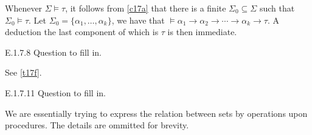 Whenever $\Sigma\vDash\tau$, it follows from \ref{c17a} that there is a finite $\Sigma_0\subseteq \Sigma$ such that $\Sigma_0\vDash\tau$. Let $\Sigma_0=\{\alpha_1,\dots,\alpha_k\}$, we have that $\vDash \alpha_1\rightarrow \alpha_2\rightarrow\cdots\rightarrow \alpha_k\rightarrow\tau$.  A deduction the last component of which is $\tau$ is then immediate.

\begin{exercise}{E.1.7.8}
  Question to fill in.
\end{exercise}

See \ref{t17f}.

\setcounter{exercise}{10}

\begin{exercise}{E.1.7.11}
  Question to fill in.
\end{exercise}

We are essentially trying to express the relation between sets by operations upon procedures. The details are ommitted for brevity.

